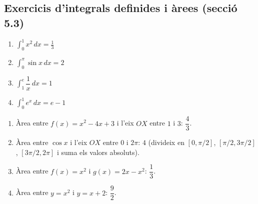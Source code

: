 \documentclass[12pt]{article}
\begin{document}
\subsection*{Exercicis d'integrals definides i àrees (secció 5.3)}

\begin{solucio}
\begin{enumerate}
    \item $\displaystyle \int_0^1 x^2\,dx = \frac{1}{3}$
    \item $\displaystyle \int_0^\pi \sin x\,dx = 2$
    \item $\displaystyle \int_1^e \dfrac{1}{x}\,dx = 1$
    \item $\displaystyle \int_0^1 e^x\,dx = e - 1$
\end{enumerate}
\end{solucio}

\begin{solucio}
\begin{enumerate}
    \item Àrea entre $f(x)=x^2-4x+3$ i l'eix $OX$ entre $1$ i $3$: $\dfrac{4}{3}$.
    \item Àrea entre $\cos x$ i l'eix $OX$ entre $0$ i $2\pi$: $4$ (divideix en $[0,\pi/2]$, $[\pi/2,3\pi/2]$, $[3\pi/2,2\pi]$ i suma els valors absoluts).
    \item Àrea entre $f(x)=x^2$ i $g(x)=2x-x^2$: $\dfrac{1}{3}$.
    \item Àrea entre $y=x^2$ i $y=x+2$: $\dfrac{9}{2}$.
\end{enumerate}
\end{solucio}
\end{document}
